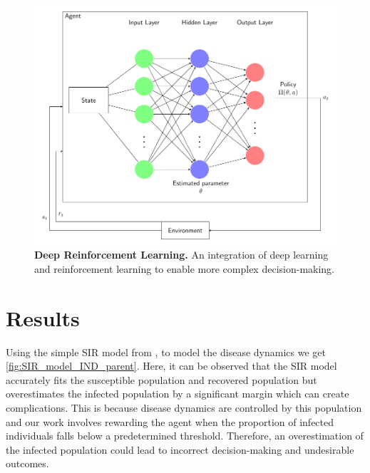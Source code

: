 \documentclass[tikz,fleqn,12pt]{wlscirep}
\begin{document}
\begin{figure}[htbp!]
  \centering
  \includegraphics[width=0.7\linewidth]{images/sir_arch.pdf}
  \caption{\textbf{Deep Reinforcement Learning.} An integration of deep learning and reinforcement learning to enable more complex decision-making.}
  \label{fig:sir_arch}
\end{figure}


\section{Results}
Using the simple SIR model from ,  to model the disease dynamics we get \cref{fig:SIR_model_IND_parent}. Here, it can be observed that the SIR model accurately fits the susceptible population and recovered population but overestimates the infected population by a significant margin which can create complications. This is because disease dynamics are controlled by this population and our work involves rewarding the agent when the proportion of infected individuals falls below a predetermined threshold. Therefore, an overestimation of the infected population could lead to incorrect decision-making and undesirable outcomes.
\end{document}
